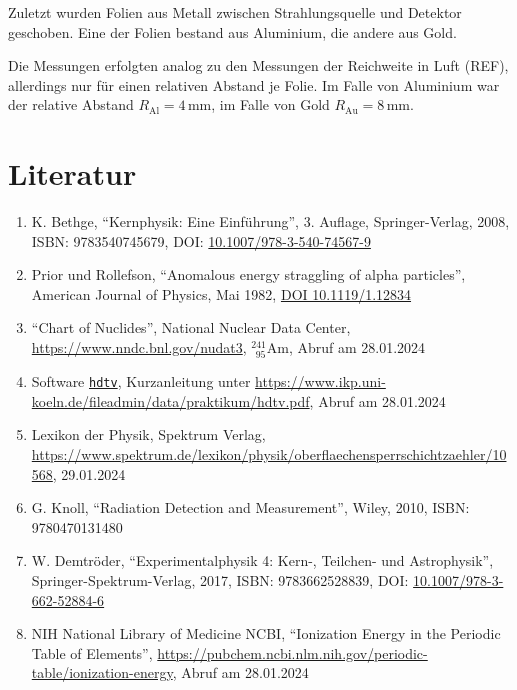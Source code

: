 \documentclass[12pt,a4paper]{scrartcl}
\numberwithin{equation}{section} %
\renewcommand{\[}{} %
\renewcommand{\]}{\noindent} %
\newcommand{\tightlist}{} %
\begin{document}
Zuletzt wurden Folien aus Metall zwischen Strahlungsquelle und Detektor
geschoben. Eine der Folien bestand aus Aluminium, die andere aus Gold.

Die Messungen erfolgten analog zu den Messungen der Reichweite in Luft
(REF), allerdings nur für einen relativen Abstand je Folie. Im Falle von
Aluminium war der relative Abstand \(R_\mathrm{Al}=4\mathrm{\,mm}\), im
Falle von Gold \(R_\mathrm{Au}=8\mathrm{\,mm}\).

\hypertarget{literatur}{%
\section{Literatur}\label{literatur}}

\begin{enumerate}
\def\labelenumi{\arabic{enumi}.}
\tightlist
\item
  K. Bethge, ``Kernphysik: Eine Einführung'', 3. Auflage,
  Springer-Verlag, 2008, ISBN: 9783540745679, DOI:
  \href{https://doi.org/10.1007/978-3-540-74567-9}{10.1007/978-3-540-74567-9}
\item
  Prior und Rollefson, ``Anomalous energy straggling of alpha
  particles'', American Journal of Physics, Mai 1982,
  \href{https://doi.org/10.1119/1.12834}{DOI 10.1119/1.12834}
\item
  ``Chart of Nuclides'', National Nuclear Data Center,
  \url{https://www.nndc.bnl.gov/nudat3}, \(^{241}_{\ \ 95}\mathrm{Am}\),
  Abruf am 28.01.2024
\item
  Software \href{https://pypi.org/project/hdtv}{\texttt{hdtv}},
  Kurzanleitung unter
  \url{https://www.ikp.uni-koeln.de/fileadmin/data/praktikum/hdtv.pdf},
  Abruf am 28.01.2024
\item
  Lexikon der Physik, Spektrum Verlag,
  \url{https://www.spektrum.de/lexikon/physik/oberflaechensperrschichtzaehler/10568},
  29.01.2024
\item
  G. Knoll, ``Radiation Detection and Measurement'', Wiley, 2010, ISBN:
  9780470131480
\item
  W. Demtröder, ``Experimentalphysik 4: Kern-, Teilchen- und
  Astrophysik'', Springer-Spektrum-Verlag, 2017, ISBN: 9783662528839,
  DOI:
  \href{https://doi.org/10.1007/978-3-662-52884-6}{10.1007/978-3-662-52884-6}
\item
  NIH National Library of Medicine NCBI,
  ``Ionization Energy in the Periodic Table of Elements'',
  \url{https://pubchem.ncbi.nlm.nih.gov/periodic-table/ionization-energy}, Abruf am 28.01.2024
\end{enumerate}
\end{document}
